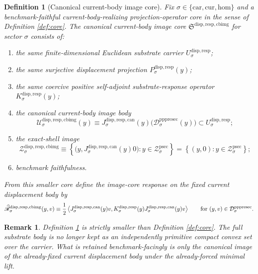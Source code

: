 \documentclass[11pt]{article}
\newcommand{\Car}{\mathrm{car}}
\newcommand{\Cur}{\mathrm{cur}}
\newcommand{\Hom}{\mathrm{hom}}
\newcommand{\ProtoSectionShell}[1]{\mathcal Z_{#1}^{\mathrm{psec}}}
\newcommand{\PrePreProtoSectionResidualBody}[1]{\mathcal D_{#1}^{\mathrm{pppresec}}}
\newcommand{\CurrentBodyImageCore}{\mathfrak S^{\mathrm{disp,resp,cbimg}}}
\newcommand{\SubstrateCarrier}[1]{U_{#1}^{\mathrm{disp,resp}}}
\newcommand{\SubstrateProjection}[1]{P_{#1}^{\mathrm{disp,resp}}}
\newcommand{\SubstrateOperator}[1]{K_{#1}^{\mathrm{disp,resp}}}
\newcommand{\CanonicalLift}[1]{J_{#1}^{\mathrm{disp,resp,can}}}
\newcommand{\CanonicalImageBody}[1]{\mathcal U_{#1}^{\mathrm{disp,resp,cbimg}}}
\newcommand{\CanonicalImageShell}[1]{\mathcal Z_{#1}^{\mathrm{disp,resp,cbimg}}}
\newcommand{\CanonicalImageResponse}[1]{\widehat{\mathscr R}_{#1}^{\mathrm{disp,resp,cbimg}}}
\newtheorem{definition}{Definition}
\newtheorem{remark}{Remark}
\begin{document}
\begin{definition}[Canonical current-body image core]
\label{def:imagecore}
Fix \(\sigma\in\{\Car,\Cur,\Hom\}\) and a benchmark-faithful current-body-realizing projection-operator core in the sense of Definition \ref{def:core}. The \emph{canonical current-body image core} \(\CurrentBodyImageCore\) for sector \(\sigma\) consists of:
\begin{enumerate}
    \item the same finite-dimensional Euclidean substrate carrier \(\SubstrateCarrier{\sigma}\);
    \item the same surjective displacement projection \(\SubstrateProjection{\sigma}(y)\);
    \item the same coercive positive self-adjoint substrate-response operator \(\SubstrateOperator{\sigma}(y)\);
    \item the canonical current-body image body
    \begin{equation}
    \CanonicalImageBody{\sigma}(y)
    \equiv
    \CanonicalLift{\sigma}(y)\bigl(\PrePreProtoSectionResidualBody{\sigma}(y)\bigr)
    \subset
    \SubstrateCarrier{\sigma};
    \label{eq:imagebody}
    \end{equation}
    \item the exact-shell image
    \begin{equation}
    \CanonicalImageShell{\sigma}
    \equiv
    \left\{
    \bigl(y,\CanonicalLift{\sigma}(y)0\bigr):
    y\in\ProtoSectionShell{\sigma}
    \right\}
    =
    \left\{
    (y,0):
    y\in\ProtoSectionShell{\sigma}
    \right\};
    \label{eq:imageshell}
    \end{equation}
    \item benchmark faithfulness.
\end{enumerate}
From this smaller core define the image-core response on the fixed current displacement body by
\begin{equation}
\CanonicalImageResponse{\sigma}(y,v)
\equiv
\frac{1}{2}
\ev{
\CanonicalLift{\sigma}(y)v,
\SubstrateOperator{\sigma}(y)\CanonicalLift{\sigma}(y)v
}
\qquad
\text{for }
(y,v)\in\PrePreProtoSectionResidualBody{\sigma}.
\label{eq:imageresponse}
\end{equation}
\end{definition}

\begin{remark}
Definition \ref{def:imagecore} is strictly smaller than Definition \ref{def:core}. The full substrate body is no longer kept as an independently primitive compact convex set over the carrier. What is retained benchmark-facingly is only the canonical image of the already-fixed current displacement body under the already-forced minimal lift.
\end{remark}
\end{document}
